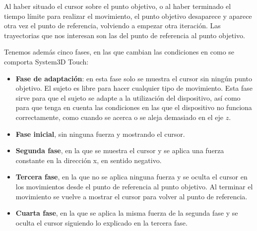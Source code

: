 \documentclass[a4paper,11pt, oneside]{book}
\begin{document}
 Al haber situado el cursor sobre el punto objetivo, o al haber terminado el tiempo límite para realizar el movimiento, el punto objetivo desaparece y aparece otra vez el punto de referencia, volviendo a empezar otra iteración. Las trayectorias que nos interesan son las del punto de referencia al punto objetivo.

Tenemos además cinco fases, en las que cambian las condiciones en como se comporta System3D Touch:

\begin{itemize}
	\item \textbf{Fase de adaptación}: en esta fase solo se muestra el cursor sin ningún punto objetivo. El sujeto es libre para hacer cualquier tipo de movimiento. Esta fase sirve para que el sujeto se adapte a la utilización del dispositivo, así como para que tenga en cuenta las condiciones en las que el dispositivo no funciona correctamente, como cuando se acerca o se aleja demasiado en el eje $z$.
	\item \textbf{Fase inicial}, sin ninguna fuerza y mostrando el cursor.
	\item \textbf{Segunda fase}, en la que se muestra el cursor y se aplica una fuerza constante en la dirección x, en sentido negativo.
	\item \textbf{Tercera fase}, en la que no se aplica ninguna fuerza y se oculta el cursor en los movimientos desde el punto de referencia al punto objetivo. Al terminar el movimiento se vuelve a mostrar el cursor para volver al punto de referencia.
	\item \textbf{Cuarta fase}, en la que se aplica la misma fuerza de la segunda fase y se oculta el cursor siguiendo lo explicado en la tercera fase.
\end{itemize}
\end{document}
